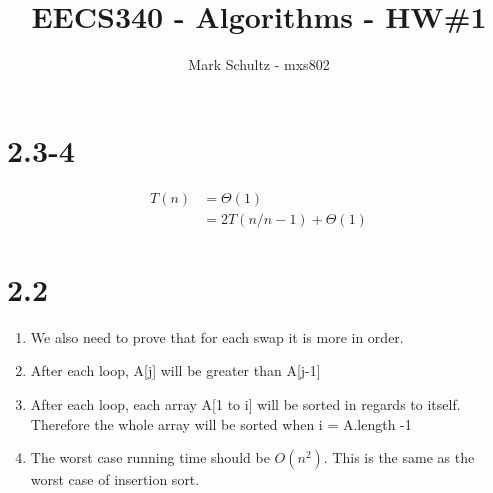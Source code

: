 \documentclass{article}
\begin{document}
\title{EECS340 - Algorithms - HW\#1}
\author{Mark Schultz - mxs802}
\maketitle
\vspace{2in}

\section*{2.3-4}
\begin{align*}
T(n) &= \Theta (1) \\
 &=2T(n/n-1)+\Theta (1)
\end{align*}
\section*{2.2}
\begin{enumerate}
\item We also need to prove that for each swap it is more in order.
\item After each loop, A[j] will be greater than A[j-1] 
\item After each loop, each array A[1 to i] will be sorted in regards to itself. Therefore the whole array will be sorted when i = A.length -1
\item The worst case running time should be $O(n^2)$. This is the same as the worst case of insertion sort.
\end{enumerate}
\end{document}
